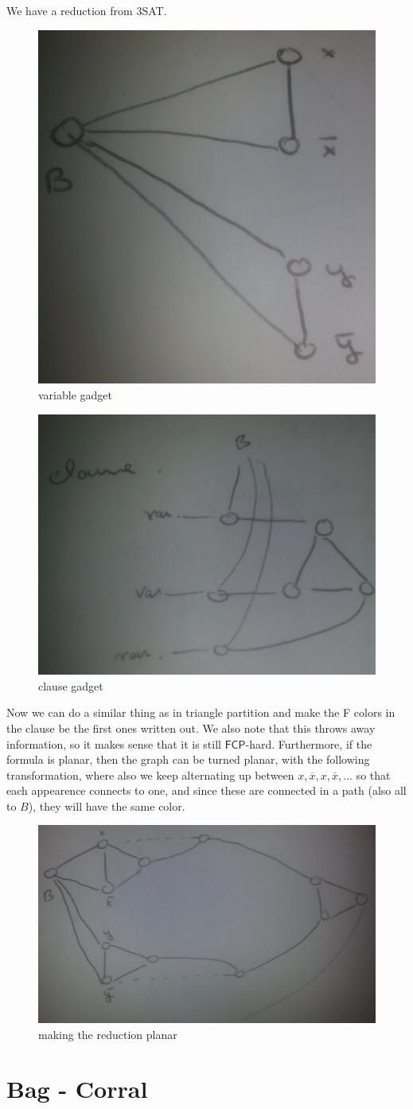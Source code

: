 \documentclass[runningheads,a4paper]{llncs}
\begin{document}
We have a reduction from 3SAT. 
\begin{figure}
\centering
\includegraphics[width=0.3\linewidth, angle=-90]{3colorable-var.jpg}
\caption{variable gadget}
\end{figure}

\begin{figure}
\centering
\includegraphics[width=0.3\linewidth]{3colorable-clause.jpg}
\caption{clause gadget}
\end{figure}

Now we can do a similar thing as in triangle partition and make the F colors in the clause be the first ones written out. We also note that this throws away information, so it makes sense that it is still $\mathsf{FCP}$-hard. Furthermore, if the formula is planar, then the graph can be turned planar, with the following transformation, where also we keep alternating up between $x, \overline{x}, x, \overline{x}, ... $ so that each appearence connects to one, and since these are connected in a path (also all to $B$), they will have the same color.

\begin{figure}
\centering
\includegraphics[width=0.4\linewidth]{3colorable-planar.jpg}
\caption{making the reduction planar}
\end{figure}

\section{Bag - Corral}
\end{document}
